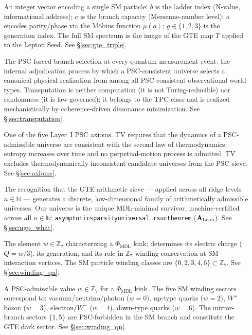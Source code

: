 \documentclass[11pt,openany]{book}
\theoremstyle{remark}
\newcommand{\PHIMDL}{\Phi_{\mathrm{MDL}}}
\newcommand{\lean}[1]{%
  \penalty-100
  \begingroup\def\_{\textunderscore\allowbreak}\texttt{#1}\endgroup}
\newcommand{\CatAL}{\ensuremath{\textbf{A}_{\rm Lean}}}
\begin{document}
\begin{appendices}
\begin{description}[leftmargin=*,font=\bfseries,itemsep=6pt]
\item[Triple $(a,b,c;\,g)$]
An integer vector encoding a single SM particle: $b$ is the ladder index
(N-value, informational address); $c$ is the branch capacity (Mersenne-number level);
$a$ encodes parity/phase via the Möbius function $\mu(a)$; $g\in\{1,2,3\}$ is the
generation index.
The full SM spectrum is the image of the GTE map $T$ applied to the Lepton Seed.
See \S\ref{sec:gte_triple}.

\item[Transputation]
The PSC-forced branch selection at every quantum measurement event: the internal
adjudication process by which a PSC-consistent universe selects a canonical physical
realization from among all PSC-consistent observational world-types.
Transputation is neither computation (it is not Turing-reducible) nor randomness
(it is law-governed); it belongs to the TPC class and is realized mechanistically
by coherence-driven dissonance minimization.
See \S\ref{sec:transputation}.

\item[TV --- Thermodynamic Viability]
One of the five Layer~I PSC axioms.
TV requires that the dynamics of a PSC-admissible universe are consistent with the
second law of thermodynamics: entropy increases over time and no perpetual-motion
process is admitted.
TV excludes thermodynamically inconsistent candidate universes from the PSC sieve.
See \S\ref{sec:axioms}.

\item[UGP --- Universal Generative Principle]
The recognition that the GTE arithmetic sieve — applied across all ridge levels
$n\in\mathbb{N}$ — generates a discrete, low-dimensional family of arithmetically
admissible universes.
Our universe is the unique MDL-minimal survivor, machine-certified across all
$n\in\mathbb{N}$: \lean{asymptotic\_sparsity\_universal}, \lean{rsuc\_theorem}
(\CatAL).
See \S\ref{sec:ugp_what}.

\item[Winding number]
The element $w\in\mathbb{Z}_7$ characterizing a $\PHIMDL$ kink; determines its
electric charge ($Q=w/3$), its generation, and its role in $\mathbb{Z}_7$ winding
conservation at SM interaction vertices.
The SM particle winding classes are $\{0,2,3,4,6\}\subset\mathbb{Z}_7$.
See \S\ref{sec:winding_qn}.

\item[Winding sector]
A PSC-admissible value $w\in\mathbb{Z}_7$ for a $\PHIMDL$ kink.
The five SM winding sectors correspond to: vacuum/neutrino/photon ($w=0$), up-type
quarks ($w=2$), $W^+$ boson ($w=3$), electron/$W^-$ ($w=4$), down-type quarks
($w=6$).
The mirror-branch sectors $\{1,5\}$ are PSC-forbidden in the SM branch and
constitute the GTE dark sector.
See \S\ref{sec:winding_qn}.


\end{description}
\end{appendices}
\end{document}
